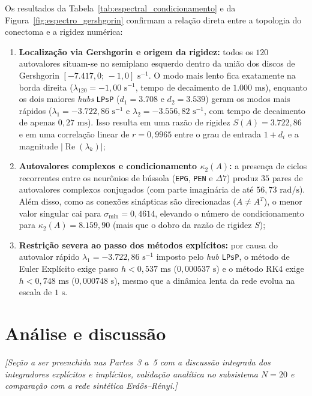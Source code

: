 \documentclass[12pt,a4paper]{article}
\begin{document}
Os resultados da Tabela~\ref{tab:espectral_condicionamento} e da Figura~\ref{fig:espectro_gershgorin} confirmam a relação direta entre a topologia do conectoma e a rigidez numérica:
\begin{enumerate}
    \item \textbf{Localização via Gershgorin e origem da rigidez:} todos os $120$ autovalores situam-se no semiplano esquerdo dentro da união dos discos de Gershgorin $[-7.417{,}0;\, -1{,}0]\text{ s}^{-1}$. O modo mais lento fica exatamente na borda direita ($\lambda_{120} = -1{,}00\text{ s}^{-1}$, tempo de decaimento de $1.000\text{ ms}$), enquanto os dois maiores \textit{hubs} \texttt{LPsP} ($d_1 = 3.708$ e $d_2 = 3.539$) geram os modos mais rápidos ($\lambda_1 = -3.722{,}86\text{ s}^{-1}$ e $\lambda_2 = -3.556{,}82\text{ s}^{-1}$, com tempo de decaimento de apenas $0{,}27\text{ ms}$). Isso resulta em uma razão de rigidez $S(A) = 3.722{,}86$ e em uma correlação linear de $r = 0{,}9965$ entre o grau de entrada $1 + d_i$ e a magnitude $|\operatorname{Re}(\lambda_k)|$;
    \item \textbf{Autovalores complexos e condicionamento $\kappa_2(A)$:} a presença de ciclos recorrentes entre os neurônios de bússola (\texttt{EPG}, \texttt{PEN} e $\Delta 7$) produz $35$ pares de autovalores complexos conjugados (com parte imaginária de até $56{,}73\text{ rad/s}$). Além disso, como as conexões sinápticas são direcionadas ($A \neq A^T$), o menor valor singular cai para $\sigma_{\min} = 0{,}4614$, elevando o número de condicionamento para $\kappa_2(A) = 8.159{,}90$ (mais que o dobro da razão de rigidez $S$);
    \item \textbf{Restrição severa ao passo dos métodos explícitos:} por causa do autovalor rápido $\lambda_1 = -3.722{,}86\text{ s}^{-1}$ imposto pelo \textit{hub} \texttt{LPsP}, o método de Euler Explícito exige passo $h < 0{,}537\text{ ms}$ ($0{,}000537\text{ s}$) e o método RK4 exige $h < 0{,}748\text{ ms}$ ($0{,}000748\text{ s}$), mesmo que a dinâmica lenta da rede evolua na escala de $1\text{ s}$.
\end{enumerate}

\section{Análise e discussão}
\textit{[Seção a ser preenchida nas Partes~3 a~5 com a discussão integrada dos integradores explícitos e implícitos, validação analítica no subsistema $N=20$ e comparação com a rede sintética Erd\H{o}s--Rényi.]}
\end{document}
